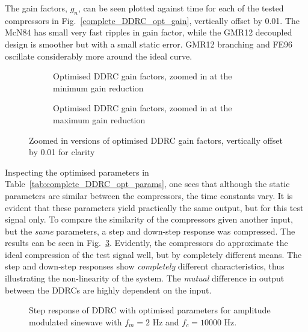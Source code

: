 \documentclass[../main2.tex]{subfiles}
\providecommand{\rootdir}{..}
\begin{document}
The gain factors, $g_n$, can be seen plotted against time for each of the tested compressors in Fig.~\ref{complete_DDRC_opt_gain}, vertically offset by 0.01. The McN84 has small very fast ripples in gain factor, while the GMR12 decoupled design is smoother but with a small static error. GMR12 branching and FE96 oscillate considerably more around the ideal curve.

\begin{figure}
\captionsetup{justification=centering}
\begin{subfigure}{\linewidth}
\centering
\centerline{}
\caption{Optimised DDRC gain factors, zoomed in at the minimum gain reduction}
\end{subfigure}

\par\bigskip

\captionsetup{justification=centering}
\begin{subfigure}{\linewidth}
\centering
\centerline{}
\caption{Optimised DDRC gain factors, zoomed in at the maximum gain reduction}
\label{fig:complete_DDRC_opt_gain}
\end{subfigure}

\caption{Zoomed in versions of optimised DDRC gain factors, vertically offset by 0.01 for clarity}
\label{fig:peak_det_opt_env_zoom}
\end{figure}

Inspecting the optimised parameters in Table~\ref{tab:complete_DDRC_opt_params}, one sees that although the static parameters are similar between the compressors, the time constants vary. It is evident that these parameters  yield practically the same output, but for this test signal only. To compare the similarity of the compressors given another input, but the \emph{same} parameters, a step and down-step response was compressed. The results can be seen in Fig.~\ref{fig:complete_DDRC_opt_step_response}. Evidently, the compressors do approximate the ideal compression of the test signal well, but by completely different means. The step and down-step responses show \emph{completely} different characteristics, thus illustrating the non-linearity of the system. The \emph{mutual} difference in output between the DDRCs are highly dependent on the input.
\begin{figure}[h]
\centerline{}
\caption{Step response of DDRC with optimised parameters for amplitude modulated sinewave with $f_m=2$ Hz and $f_c=10000$ Hz.}
\label{fig:complete_DDRC_opt_step_response}
\end{figure}
\end{document}
